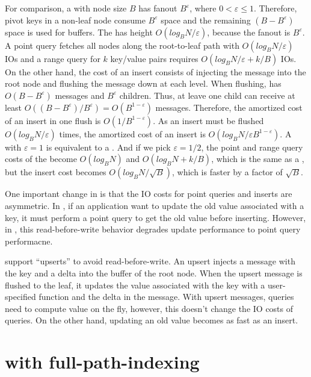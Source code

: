 For comparison, a \bet with node size $B$ has fanout $B^{\varepsilon}$, where
$0 < \varepsilon \leq 1$.
Therefore, pivot keys in a non-leaf node consume $B^{\varepsilon}$ space and
the remaining $(B - B^{\varepsilon})$ space is used for buffers.
The \bet has height $O(log_{B}{N}/\varepsilon)$, because the fanout is
$B^{\varepsilon}$.
A point query fetches all nodes along the root-to-leaf path with
$O(log_{B}{N}/\varepsilon)$ IOs and a range query for $k$ key/value pairs
requires $O({log_{B}{N}}/{\varepsilon} + k/B)$ IOs.
On the other hand, the cost of an insert consists of injecting the message into
the root node and flushing the message down at each level.
When flushing, \bets has $O(B - B^{\varepsilon})$ messages and $B^{\varepsilon}$
children.
Thus, at leave one child can receive at least
$O((B - B^{\varepsilon})/B^{\varepsilon}) = O(B^{1 - \varepsilon})$ messages.
Therefore, the amortized cost of an insert in one flush is
$O(1/B^{1 - \varepsilon})$.
As an insert must be flushed $O(log_{B}{N}/\varepsilon)$ times, the amortized
cost of an insert is $O({log_{B}{N}}/{\varepsilon B^{1 - \varepsilon}})$.
A \bet with $\varepsilon = 1$ is equivalent to a \btree.
And if we pick $\varepsilon = 1/2$, the point and range query costs of the \bet
become $O(log_{B}{N})$ and $O(log_{B}{N} + k/B)$, which is the same as a \btree,
but the insert cost becomes $O(log_{B}{N}/{\sqrt{B}})$, which is faster by a
factor of $\sqrt{B}$.

One important change in \bets is that the IO costs for point queries and inserts
are asymmetric.
In \btrees, if an application want to update the old value associated with a
key, it must perform a point query to get the old value before inserting.
However, in \bets, this read-before-write behavior degrades update
performance to point query performacne.

\bets support ``upserts'' to avoid read-before-write.
An upsert injects a message with the key and a delta into the buffer of the root
node.
When the upsert message is flushed to the leaf, it updates the value associated
with the key with a user-specified function and the delta in the message.
With upsert messages, queries need to compute value on the fly, however, this
doesn't change the IO costs of queries.
On the other hand, updating an old value becomes as fast as an insert.

\section{\betrfs with full-path-indexing}
\label{sec:betrfs}

